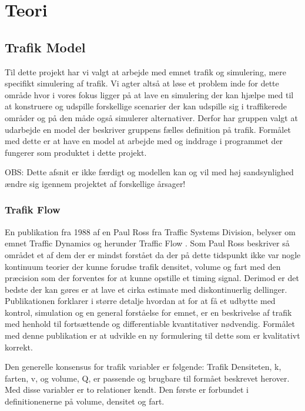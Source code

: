 \chapter{Teori}\label{Teori}

\section{Trafik Model}

Til dette projekt har vi valgt at arbejde med emnet trafik og simulering, mere specifikt simulering af trafik. Vi agter altså at løse et problem inde for dette område hvor i vores fokus ligger på at lave en simulering der kan hjælpe med til at konstruere og udspille forskellige scenarier der kan udspille sig i traffikerede områder og på den måde også simulerer alternativer. Derfor har gruppen valgt at udarbejde en model der beskriver gruppens fælles definition på trafik. Formålet med dette er at have en model at arbejde med og inddrage i programmet der fungerer som produktet i dette projekt.

OBS: Dette afsnit er ikke færdigt og modellen kan og vil med høj sandsynlighed ændre sig igennem projektet af forskellige årsager! 

\subsection{Trafik Flow}

En publikation fra 1988 af en Paul Ross fra Traffic Systems Division, belyser om emnet Traffic Dynamics og herunder Traffic Flow \cite{trafdyn}. Som Paul Ross beskriver så området et af dem der er mindst forstået da der på dette tidspunkt ikke var nogle kontinuum teorier der kunne forudse trafik densitet, volume og fart med den præcision som der forventes for at kunne opstille et timing signal. Derimod er det bedste der kan gøres er at lave et cirka estimate med diskontinuerlig dellinger. Publikationen forklarer i større detalje hvordan at for at få et udbytte med kontrol, simulation og en general forståelse for emnet, er en beskrivelse af trafik med henhold til fortsættende og differentiable kvantitativer nødvendig. Formålet med denne publikation er at udvikle en ny formulering til dette som er kvalitativt korrekt. 

Den generelle konsensus for trafik variabler er følgende: Trafik Densiteten, k, farten, v, og volume, Q, er passende og brugbare til formået beskrevet herover. Med disse variabler er to relationer kendt. Den første er forbundet i definitionenerne på volume, densitet og fart.

